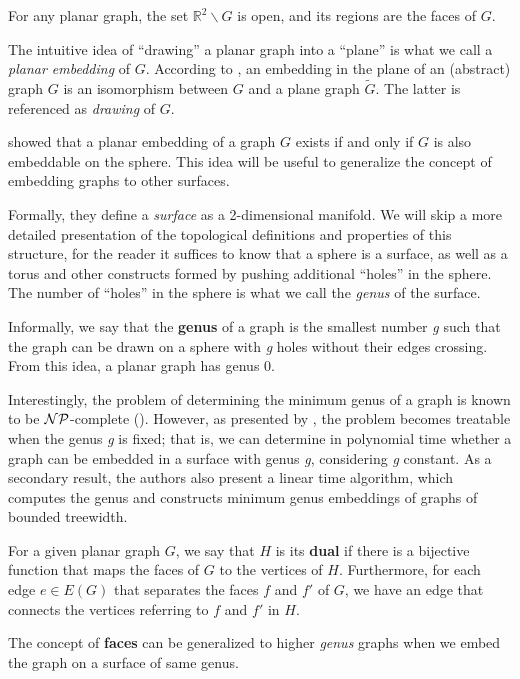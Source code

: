 For any planar graph, the set \(\mathbb{R}^2 \backslash G\) is open, and its regions are the faces of \(G\).

The intuitive idea of ``drawing'' a planar graph into a ``plane'' is what we call a \textit{planar embedding} of \(G\). According to \cite{Diestel}, an embedding in the plane of an (abstract) graph \(G\) is an isomorphism between \(G\) and a plane graph \(\tilde{G}\). The latter is referenced as \textit{drawing} of \(G\).

\cite{BondyNMurty} showed that a planar embedding of a graph \(G\) exists if and only if \(G\) is also embeddable on the sphere. This idea will be useful to generalize the concept of embedding graphs to other surfaces.

Formally, they define a \textit{surface} as a 2-dimensional manifold. We will skip a more detailed presentation of the topological definitions and properties of this structure, for the reader it suffices to know that a sphere is a surface, as well as a torus and other constructs formed by pushing additional ``holes'' in the sphere. The number of ``holes'' in the sphere is what we call the \textit{genus} of the surface.

Informally, we say that the \textbf{genus} of a graph is the smallest number \textit{g} such that the graph can be drawn on a sphere with \textit{g} holes without their edges crossing. From this idea, a planar graph has genus 0.

Interestingly, the problem of determining the minimum genus of a graph is known to be \(\mathcal{NP}\)-complete (\cite{THOMASSEN1989568}). However, as presented by \cite{LinearGenus}, the problem becomes treatable when the genus \textit{g} is fixed; that is, we can determine in polynomial time whether a graph can be embedded in a surface with genus \textit{g}, considering \textit{g} constant. As a secondary result, the authors also present a linear time algorithm, which computes the genus and constructs minimum genus embeddings of graphs of bounded treewidth. 

For a given planar graph \(G\), we say that \(H\) is its \textbf{dual} if there is a bijective function that maps the faces of \(G\) to the vertices of \(H\). Furthermore, for each edge \(e \in E(G)\) that separates the faces \(f\) and \(f'\) of \(G\), we have an edge that connects the vertices referring to \(f\) and \(f'\) in \(H\).

The concept of \textbf{faces} can be generalized to higher \textit{genus} graphs when we embed the graph on a surface of same genus.

